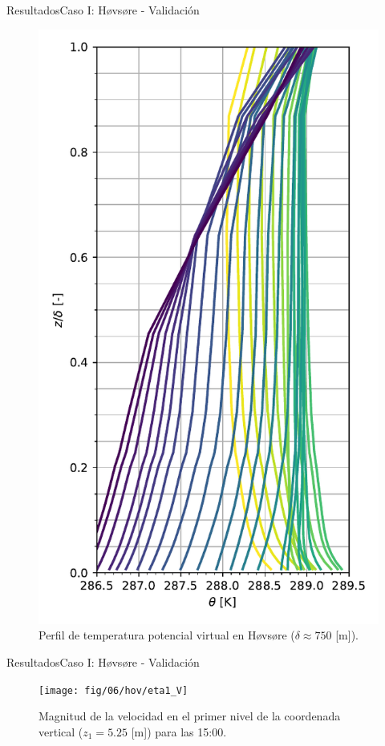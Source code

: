 \documentclass[mathserif,10pt]{beamer}
\begin{document}
\begin{frame}{Resultados}{Caso I: Høvsøre - Validación}
\begin{figure}[H]
\begin{minipage}{0.5\linewidth}
		\end{minipage}%
		\begin{minipage}{0.5\linewidth}
			\centering
			\includegraphics[width=0.75\linewidth,trim={0cm 5mm 0cm 0cm},clip]{fig/06/hov/temp_profile}%
		\end{minipage}%
		
		\caption{Perfil de temperatura potencial virtual en Høvsøre ($\delta \approx 750$ [m]).}
		\label{fig:06_hov_pbl}
	\end{figure}
\end{frame}

\begin{frame}{Resultados}{Caso I: Høvsøre - Validación}
	\begin{figure}[H]
		\centering
		\texttt{[image: fig/06/hov/eta1\_V]}%
		\caption{Magnitud de la velocidad en el primer nivel de la coordenada vertical ($z_1=5.25$ [m]) para las 15:00.}
		\label{fig:06_hov_eta1}
	\end{figure}
\end{frame}
\end{document}
